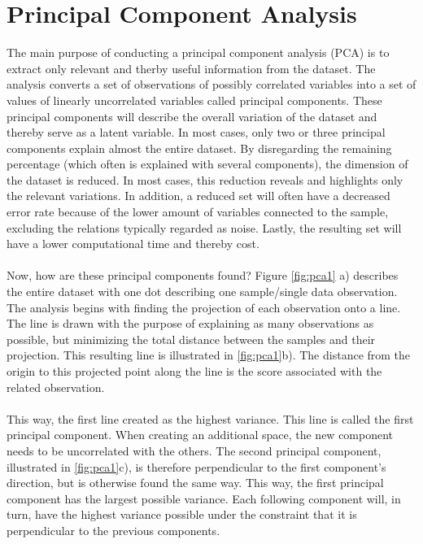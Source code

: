 \section{Principal Component Analysis} \label{sec:pca}
The main purpose of conducting a principal component analysis (PCA) is to extract only relevant and therby useful information from the dataset. The analysis converts a set of observations of possibly correlated variables into a set of values of linearly uncorrelated variables called principal components. These principal components will describe the overall variation of the dataset and thereby serve as a latent variable. In most cases, only two or three principal components explain almost the entire dataset. By disregarding the remaining percentage (which often is explained with several components), the dimension of the dataset is reduced. In most cases, this reduction reveals and highlights only the relevant variations. In addition, a reduced set will often have a decreased error rate because of the lower amount of variables connected to the sample, excluding the relations typically regarded as noise. Lastly, the resulting set will have a lower computational time and thereby cost.
\\\\
Now, how are these principal components found? Figure \ref{fig:pca1} a) describes the entire dataset with one dot describing one sample/single data observation. The analysis begins with finding the projection of each observation onto a line. The line is drawn with the purpose of explaining as many observations as possible, but minimizing the total distance between the samples and their projection. This resulting line is illustrated in \ref{fig:pca1}b). The distance from the origin to this projected point along the line is the score associated with the related observation. 
\\\\
\noindent
This way, the first line created as the highest variance. This line is called the first principal component. When creating an additional space, the new component needs to be uncorrelated with the others. The second principal component, illustrated in \ref{fig:pca1}c), is therefore perpendicular to the first component’s direction, but is otherwise found the same way. This way, the first principal component has the largest possible variance. Each following component will, in turn, have the highest variance possible under the constraint that it is perpendicular to the previous components.
